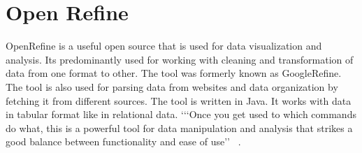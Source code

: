 \section{Open Refine}

OpenRefine is a useful open source that is used for data visualization and analysis. 
Its predominantly used for working with cleaning and transformation of data from one format to other.
The tool was formerly known as GoogleRefine. The tool is also used for parsing data from websites and data organization
by fetching it from different sources. The tool is written in Java. It works with data in tabular format like in relational data.
`‘‘Once you get used to which commands do what, this is a powerful tool for data manipulation and analysis
that strikes a good balance between functionality and ease of use’’ ~\cite{hid-sp18-417-openrefine}.


